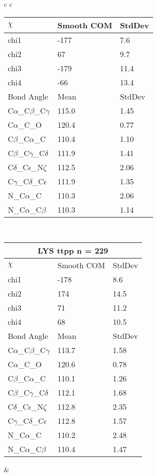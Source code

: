 \begin{longtable}{ c c }
\begin{tabular}{ l l l }
  $\chi$       & Smooth COM & StdDev \\ \midrule
  chi1 & -177 & 7.6 \\ 
  chi2 & 67 & 9.7 \\ 
  chi3 & -179 & 11.4 \\ 
  chi4 & -66 & 13.4 \\ \midrule
  Bond Angle   & Mean     & StdDev \\ \midrule
  C$\alpha$\_C$\beta$\_C$\gamma$ & 115.0 & 1.45\\
  C$\alpha$\_C\_O & 120.4 & 0.77\\
  C$\beta$\_C$\alpha$\_C & 110.4 & 1.10\\
  C$\beta$\_C$\gamma$\_C$\delta$ & 111.9 & 1.41\\
  C$\delta$\_C$\epsilon$\_N$\zeta$ & 112.5 & 2.06\\
  C$\gamma$\_C$\delta$\_C$\epsilon$ & 111.9 & 1.35\\
  N\_C$\alpha$\_C & 110.3 & 2.06\\
  N\_C$\alpha$\_C$\beta$ & 110.3 & 1.14\\
  \bottomrule
  \end{tabular}
  \\
  \begin{tabular}{ l l l }
  \toprule
  \multicolumn{3}{c}{LYS \textbf{ttpp} n = 229} \\ \toprule
  $\chi$       & Smooth COM & StdDev \\ \midrule
  chi1 & -178 & 8.6 \\ 
  chi2 & 174 & 14.5 \\ 
  chi3 & 71 & 11.2 \\ 
  chi4 & 68 & 10.5 \\ \midrule
  Bond Angle   & Mean     & StdDev \\ \midrule
  C$\alpha$\_C$\beta$\_C$\gamma$ & 113.7 & 1.58\\
  C$\alpha$\_C\_O & 120.6 & 0.78\\
  C$\beta$\_C$\alpha$\_C & 110.1 & 1.26\\
  C$\beta$\_C$\gamma$\_C$\delta$ & 112.1 & 1.68\\
  C$\delta$\_C$\epsilon$\_N$\zeta$ & 112.8 & 2.35\\
  C$\gamma$\_C$\delta$\_C$\epsilon$ & 112.8 & 1.57\\
  N\_C$\alpha$\_C & 110.2 & 2.48\\
  N\_C$\alpha$\_C$\beta$ & 110.4 & 1.47\\
  \bottomrule
  \end{tabular}
  &

\end{longtable}
